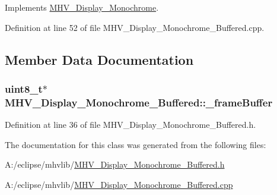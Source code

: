 \-Implements \hyperlink{class_m_h_v___display___monochrome_a58a17e8662802e7f5d6ccd6f0bcc51a0}{\-M\-H\-V\-\_\-\-Display\-\_\-\-Monochrome}.



\-Definition at line 52 of file \-M\-H\-V\-\_\-\-Display\-\_\-\-Monochrome\-\_\-\-Buffered.\-cpp.



\subsection{\-Member \-Data \-Documentation}
\hypertarget{class_m_h_v___display___monochrome___buffered_a2e63d0f32900fc0e078a46edf011b7aa}{
\subsubsection[{\-\_\-frame\-Buffer}]{\setlength{\rightskip}{0pt plus 5cm}uint8\-\_\-t$\ast$ {\bf \-M\-H\-V\-\_\-\-Display\-\_\-\-Monochrome\-\_\-\-Buffered\-::\-\_\-frame\-Buffer}}}
\label{class_m_h_v___display___monochrome___buffered_a2e63d0f32900fc0e078a46edf011b7aa}


\-Definition at line 36 of file \-M\-H\-V\-\_\-\-Display\-\_\-\-Monochrome\-\_\-\-Buffered.\-h.



\-The documentation for this class was generated from the following files\-:\begin{DoxyCompactItemize}
\item 
\-A\-:/eclipse/mhvlib/\hyperlink{_m_h_v___display___monochrome___buffered_8h}{\-M\-H\-V\-\_\-\-Display\-\_\-\-Monochrome\-\_\-\-Buffered.\-h}\item 
\-A\-:/eclipse/mhvlib/\hyperlink{_m_h_v___display___monochrome___buffered_8cpp}{\-M\-H\-V\-\_\-\-Display\-\_\-\-Monochrome\-\_\-\-Buffered.\-cpp}\end{DoxyCompactItemize}
